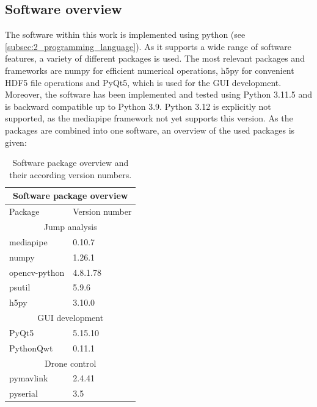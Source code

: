 \subsection{Software overview}\label{subsec:3_versions}
The software within this work is implemented using python (see
\autoref{subsec:2_programming_language}).
As it supports a wide range of software features, a variety of
different packages is used.
The most relevant packages and frameworks are numpy for efficient numerical
operations, h5py for convenient HDF5 file operations and PyQt5, which is used
for the \ac{GUI} development.\\
Moreover, the software has been implemented and tested using Python
3.11.5 and is backward compatible up to Python 3.9.
Python 3.12 is explicitly not supported, as the mediapipe framework not yet
supports this version.
As the packages are combined into one software, an overview of the used
packages is given:

\begin{table}[h!]
    \centering
    \begin{tabular}[c]{|p{6cm}|p{6cm}|}
    \hline
    \multicolumn{2}{|c|}{\cellcolor{gray!20}Software package overview}\\
    \hline
    Package & Version number\\
    \hline
    \hline
    \multicolumn{2}{|c|}{\cellcolor{cyan!15}Jump analysis}\\
    \hline
    mediapipe & 0.10.7\\
    \hline
    numpy & 1.26.1\\
    \hline
    opencv-python & 4.8.1.78\\
    \hline
    psutil & 5.9.6\\ 
    \hline
    h5py & 3.10.0\\
    \hline
    \multicolumn{2}{|c|}{\cellcolor{cyan!15}\acs*{GUI} development}\\
    \hline
    PyQt5 & 5.15.10\\
    \hline
    PythonQwt & 0.11.1\\
    \hline
    \multicolumn{2}{|c|}{\cellcolor{cyan!15}Drone control}\\
    \hline
    pymavlink & 2.4.41\\
    \hline
    pyserial & 3.5\\
    \hline
    \end{tabular}
    \caption[Software overview]{Software package overview and their according
    version numbers.}
    \label{table:3_software_overview_version_num}
\end{table}


